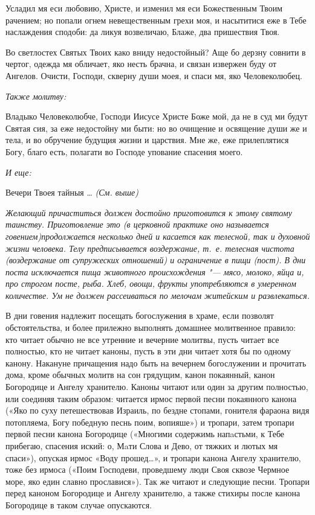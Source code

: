 Усладил мя еси любовию, Христе, и изменил мя еси Божественным Твоим рачением; но попали огнем невещественным грехи моя, и насытитися еже в Тебе наслаждения сподоби: да ликуя возвеличаю, Блаже, два пришествия Твоя.


Во светлостех Святых Твоих како вниду недостойный? Аще бо дерзну совнити в чертог, одежда мя обличает, яко несть брачна, и связан извержен буду от Ангелов. Очисти, Господи, скверну души моея, и спаси мя, яко Человеколюбец.


\medskip\itshape Также молитву:\normalfont{}


Владыко Человеколюбче, Господи Иисусе Христе Боже мой, да не в суд ми будут Святая сия, за еже недостойну ми быти: но во очищение и освящение души же и тела, и во обручение будущия жизни и царствия. Мне же, еже прилеплятися Богу, благо есть, полагати во Господе упование спасения моего.


\medskip\itshape И еще:\normalfont{}


Вечери Твоея тайныя … \itshape (См. выше)\normalfont{}


\medskip\itshape Желающий причаститься должен достойно приготовится к этому святому таинству. Приготовление это (в церковной практике оно называется говением)продолжается несколько дней и касается как телесной, так и духовной жизни человека. Телу предписывается воздержание, т.~е. телесная чистота (воздержание от супружеских отношений) и ограничение в пищи (пост). В дни поста исключается пища животного происхождения "--- мясо, молоко, яйца и, про строгом посте, рыба. Хлеб, овощи, фрукты употребляются в умеренном количестве. Ум не должен рассеиваться по мелочам житейским и развлекаться.


В дни говения надлежит посещать богослужения в храме, если позволят обстоятельства, и более прилежно выполнять домашнее молитвенное правило: кто читает обычно не все утренние и вечерние молитвы, пусть читает все полностью, кто не читает каноны, пусть в эти дни читает хотя бы по одному канону. Накануне причащения надо быть на вечернем богослужении и прочитать дома, кроме обычных молитв на сон грядущим, канон покаянный, канон Богородице и Ангелу хранителю. Каноны читают или один за другим полностью, или соединяя таким образом: читается ирмос первой песни покаянного канона («Яко по суху петешествовав Израиль, по бездне стопами, гонителя фараона видя потопляема, Богу победную песнь поим, вопияше») и тропари, затем тропари первой песни канона Богородице («Многими содержимь напaстьми, к Тебе прибегаю, спасения иский: о, Мaти Слова и Дево, от тяжких и лютых мя спаси»), опуская ирмос «Воду прошед…», и тропари канона Ангелу хранителю, тоже без ирмоса («Поим Господеви, проведшему люди Своя сквозе Чермное море, яко един славно прославися»). Так же читают и следующие песни. Тропари перед каноном Богородице и Ангелу хранителю, а также стихиры после канона Богородице в таком случае опускаются.


